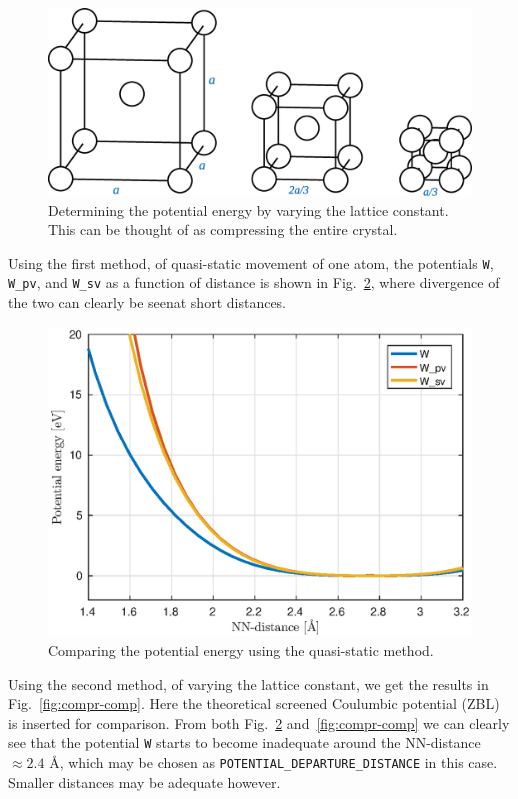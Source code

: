 \documentclass{article}
\begin{document}
\begin{figure}[H]
  \centering
  \includegraphics[scale=0.4]{img/compr-pot3.eps}
  \caption{Determining the potential energy by varying the lattice constant. This can be thought of as compressing the entire crystal.}
  \label{fig:compr-pot}
\end{figure}

Using the first method, of quasi-static movement of one atom, the potentials \texttt{W}, \texttt{W\_pv}, and \texttt{W\_sv} as a function of distance is shown in Fig.~\ref{fig:quasi-comp}, where divergence of the two can clearly be seenat short distances.

\begin{figure}[H]
  \centering
  \includegraphics[scale=0.82]{img/pot-comp-quasi2.eps}
  \caption{Comparing the potential energy using the quasi-static method.}
  \label{fig:quasi-comp}
\end{figure}

Using the second method, of varying the lattice constant, we get the results in Fig.~\ref{fig:compr-comp}. Here the theoretical screened Coulumbic potential (ZBL) is inserted for comparison. From both Fig.~\ref{fig:quasi-comp} and~\ref{fig:compr-comp} we can clearly see that the potential \texttt{W} starts to become inadequate around the NN-distance $\approx 2.4$ Å, which may be chosen as \texttt{POTENTIAL\_DEPARTURE\_DISTANCE} in this case. Smaller distances may be adequate however.
\end{document}
